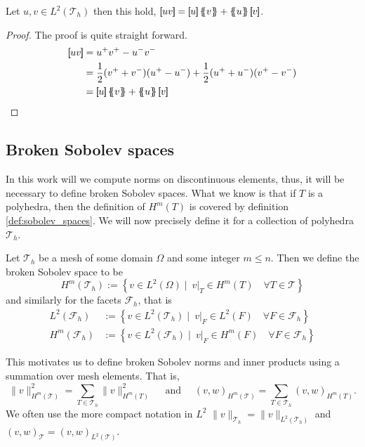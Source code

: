 \begin{lemma}
    \label{lemma:magic_formula}
    Let $u,v \in L^2( \mathcal{T}_{h} ) $ then this hold,
    $  \jump{ uv }    = \jump{ u }   \mean{ v }    + \mean{ u }  \jump{ v }     $.
\end{lemma}
\begin{proof}
    The proof is quite straight forward.
    \[
        \begin{split}
    \jump{ uv }   & = u^{+}v^{+} - u^{-}v^{-} \\
     & =  \frac{1}{2}(v^{+} + v^{-})( u^{+} - u^{-})+ \frac{1}{2}(u^{+} + u^{-})( v^{+} - v^{-})   \\
     & =  \jump{ u }   \mean{ v }    + \mean{ u }  \jump{ v }
        \end{split}
    \]
\end{proof}


\subsection{Broken Sobolev spaces}%
\label{sub:broken_sobolev_spaces}

In this work will we compute norms on discontinuous elements, thus, it will be necessary to define broken Sobolev spaces. What we know is that if $T$ is a polyhedra, then the definition of $H^{m}( T)$ is covered by definition
\ref{def:sobolev_spaces}. We will now precisely define it for a collection of polyhedra $\mathcal{T}_{h}$.

\begin{definition}
Let $\mathcal{T}_{h} $ be a mesh of some domain $\Omega  $ and some integer $m\le n$. Then we define the broken Sobolev space to be \[
H^{m}( \mathcal{T}_{h} ) := \left\{ v \in L^2( \Omega )  \mid \ v|_{T} \in H^{m}( T) \quad     \forall T \in  \mathcal{T} \right\}
\]
and similarly for the facets $\mathcal{F}_{h} $, that is
\[
    \begin{split}
        L^{2}( \mathcal{F}_{h} ) &:= \left\{ v \in L^2( \mathcal{T}_{h}  )  \mid   \ v|_{F} \in L^{2}( F)  \quad  \forall F \in  \mathcal{F}_{h}   \right\} \\
        H^{m}( \mathcal{F}_{h} ) &:= \left\{ v \in L^2( \mathcal{F}_{h}  )  \mid   \ v|_{F} \in H^{m}( F)  \quad  \forall F \in  \mathcal{F}_{h}   \right\}
    \end{split}
\]
\end{definition}
This motivates us to define broken Sobolev norms and inner products using a summation over mesh elements. That is,
\[
 \| v \|_{H^{m}( \mathcal{T} ) }^{2} = \sum_{T \in  \mathcal{T}_{h} }^{} \| v  \|_{ H^{m}( T ) }^{2  } \quad \text{ and } \quad
 (v ,w )_{H^{m}( \mathcal{T} ) }^{} = \sum_{T \in \mathcal{T} _{h}}^{} (v ,w )_{ H^{m}( T ) }^{  } .
\]
We often use the more compact notation in $L^{2}$  $\| v \|_{\mathcal{T}_{h}} =  \| v \|_{L^{2}( \mathcal{T}_{h} ) }$ and  $(v ,w )_{ \mathcal{T} }^{} = (v ,w )_{L^2( \mathcal{T} ) }^{} $.

